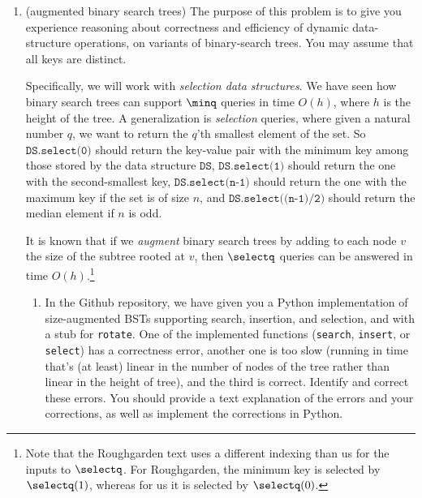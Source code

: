 \documentclass[11pt]{report}
\begin{document}
\begin{enumerate}
\[
T_1(n)
+
q_1(n)\Big[
T_2(h_1(n)) + q_2(h_1(n))
\Big]
\]

\[
\text{The coefficient of } g \text{ gives us \# of oracle calls to } g
\]

\[
q_3(n) = q_1(n)\, q_2(h_1(n))
\]

\[
\text{The argument in } g \text{ gives } h_3
\]

\[
h_3(n) = h_2(h_1(n))
\]



    \newpage

    
    \item (augmented binary search trees)
    The purpose of this problem is to give you experience reasoning about correctness and efficiency of dynamic data-structure operations, on variants of binary-search trees. You may assume that all keys are distinct.
    
    Specifically, we will work with {\em selection data structures}.
    We have seen how binary search trees can support $\minq$ queries in time $O(h)$, where $h$ is the height of the tree.  A generalization is {\em selection} queries, where given a natural number $q$, we want to return the $q$'th smallest element of the set.  So $\texttt{DS.select(0)}$ should return the key-value pair with the minimum key among those stored by the data structure $\texttt{DS}$, $\texttt{DS.select(1)}$ should return the one with the second-smallest key, $\texttt{DS.select(n-1)}$ should return the one with the maximum key if the set is of size $n$, and $\texttt{DS.select((n-1)/2)}$ should return the median element if $n$ is odd.
    
    It is known that if we {\em augment} binary search trees by adding to each node $v$ the size of the subtree rooted at $v$, then $\selectq$ queries can be answered in time $O(h)$.\footnote{Note that the Roughgarden text uses a different indexing than us for the inputs to $\selectq$. For Roughgarden, the minimum key is selected by $\selectq(1)$, whereas for us it is selected by $\selectq(0)$.}

    
    \begin{enumerate}
        \item In the Github repository, we have given you a Python implementation of size-augmented BSTs supporting search, insertion, and selection, and with a stub for \texttt{rotate}. One of the implemented functions (\texttt{search}, \texttt{insert}, or \texttt{select}) has a correctness error, another one is too slow (running in time that's (at least) linear in the number of nodes of the tree rather than linear in the height of tree), and the third is correct. 
        Identify and correct these errors. You should provide a text explanation of the errors and your corrections, as well as implement the corrections in Python.    



\end{enumerate}
\end{enumerate}
\end{document}
